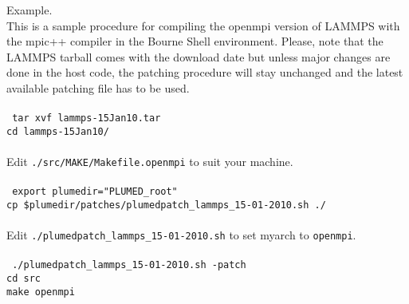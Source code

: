 \documentclass[12pt,fleqn]{report}
\newcommand{\esempio}[1]{
\vspace{10pt}
\begin{flushright}
\colorbox{light-gray}{
   \begin{minipage}{13cm}
       \scriptsize{
{\fontfamily{phv} \fontseries{b}
 \selectfont Example. \\
 \fontseries{m} \selectfont #1 } }
\end{minipage}}
\end{flushright}
\vspace{20pt}
}
\begin{document}
\esempio{
This is a sample procedure for compiling the openmpi version of LAMMPS with the mpic++ 
compiler in the Bourne Shell environment. Please, note that the LAMMPS tarball 
comes with the download date but unless major changes are done in the host code, the 
patching procedure will stay unchanged and the latest available patching file has to be 
used. \\ \\
{\tt
tar xvf lammps-15Jan10.tar \\
cd lammps-15Jan10/ \\
}
\\ Edit {\tt ./src/MAKE/Makefile.openmpi} to suit your machine. \\ \\
{\tt
export plumedir="PLUMED\_root" \\
cp \${plumedir}/patches/plumedpatch\_lammps\_15-01-2010.sh ./ \\
}
\\ Edit {\tt ./plumedpatch\_lammps\_15-01-2010.sh} to set myarch to {\tt openmpi}. \\ \\
{\tt
./plumedpatch\_lammps\_15-01-2010.sh -patch \\
cd src \\
make openmpi \\
}
}
\end{document}
